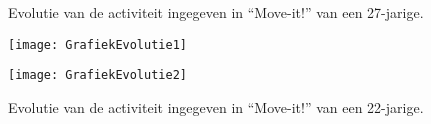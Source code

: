 \begin{figure}[htbp]
    \begin{minipage}[t]{0.48\linewidth} %
        \centering
        \caption[Evolutie van de activiteit van een 27-jarige]{Evolutie van de activiteit ingegeven in ``Move-it!'' van een 27-jarige.}
        \texttt{[image: GrafiekEvolutie1]}
        \label{fig:evolutie1}
    \end{minipage}
    \hfill
    \begin{minipage}[t]{0.48\linewidth} %
        \centering
        \caption[Evolutie van de activiteit van een 22-jarige]{Evolutie van de activiteit ingegeven in ``Move-it!'' van een 22-jarige.}
        \texttt{[image: GrafiekEvolutie2]}
        \label{fig:evolutie2}
    \end{minipage}
\end{figure}


